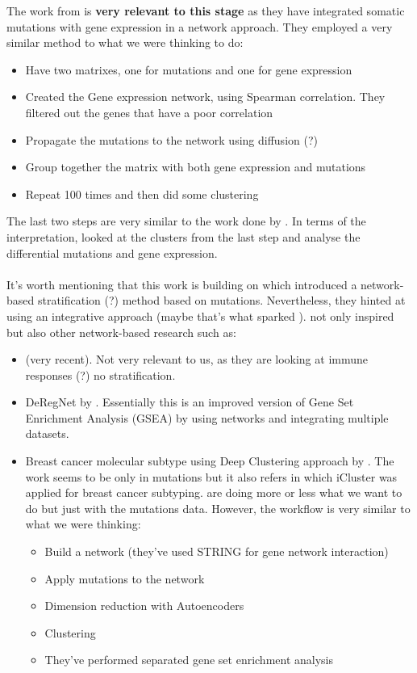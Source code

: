 The work from \citet{He2017-dj} is \textbf{very relevant to this stage} as they have integrated somatic mutations with gene expression in a network approach.  They employed a very similar method to what we were thinking to do:
\begin{itemize}
    \item Have two matrixes, one for mutations and one for gene expression
    \item Created the Gene expression network, using Spearman correlation. They filtered out the genes that have a poor correlation
    \item Propagate the mutations to the network using diffusion (?)
    \item Group together the matrix with both gene expression and mutations
    \item Repeat 100 times and then did some clustering

\end{itemize}

The last two steps are very similar to the work done by \citet{Robertson2017-mg}. In terms of the interpretation, \citet{He2017-dj} looked at the clusters from the last step and analyse the differential mutations and gene expression.
\\~\\
It's worth mentioning that this work is building on \citet{Hofree2013-ld} which introduced a network-based stratification (?) method based on mutations. Nevertheless, they hinted at using an integrative approach (maybe that's what sparked \citet{He2017-dj}). \citet{Hofree2013-ld} not only inspired \citet{He2017-dj} but also other network-based research such as:
\begin{itemize}
    \item \citet{Kong2022-gv} (very recent). Not very relevant to us, as they are looking at immune responses (?) no stratification.
     \item DeRegNet by \citet{Winkler2022-vg}. Essentially this is an improved version of Gene Set Enrichment Analysis (GSEA) by using networks and integrating multiple datasets.
     \item Breast cancer molecular subtype using Deep Clustering approach by \citet{Rohani2020-px}. The work seems to be only in mutations but it also refers \citet{Curtis2012-ff} in which iCluster was applied for breast cancer subtyping. \citet{Rohani2020-px} are doing more or less what we want to do but just with the mutations data. However, the workflow is very similar to what we were thinking:
     \begin{itemize}
         \item Build a network (they've used STRING for gene network interaction)
         \item Apply mutations to the network
         \item Dimension reduction with Autoencoders
         \item Clustering
         \item They've performed separated gene set enrichment analysis
     \end{itemize}
\end{itemize}

